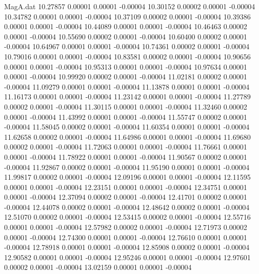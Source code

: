 \begin{filecontents}{MagA.dat}
  10.27857    0.00001    0.00001   -0.00004
  10.30152    0.00002    0.00001   -0.00004
  10.34782    0.00001    0.00001   -0.00004
  10.37109    0.00002    0.00001   -0.00004
  10.39386    0.00001    0.00001   -0.00004
  10.44089    0.00001    0.00001   -0.00004
  10.46463    0.00002    0.00001   -0.00004
  10.55690    0.00002    0.00001   -0.00004
  10.60400    0.00002    0.00001   -0.00004
  10.64967    0.00001    0.00001   -0.00004
  10.74361    0.00002    0.00001   -0.00004
  10.79016    0.00001    0.00001   -0.00004
  10.83581    0.00002    0.00001   -0.00004
  10.90656    0.00001    0.00001   -0.00004
  10.95313    0.00001    0.00001   -0.00004
  10.97634    0.00001    0.00001   -0.00004
  10.99920    0.00002    0.00001   -0.00004
  11.02181    0.00002    0.00001   -0.00004
  11.09279    0.00001    0.00001   -0.00004
  11.13878    0.00001    0.00001   -0.00004
  11.16173    0.00001    0.00001   -0.00004
  11.23142    0.00001    0.00001   -0.00004
  11.27789    0.00002    0.00001   -0.00004
  11.30115    0.00001    0.00001   -0.00004
  11.32460    0.00002    0.00001   -0.00004
  11.43992    0.00001    0.00001   -0.00004
  11.55747    0.00002    0.00001   -0.00004
  11.58045    0.00002    0.00001   -0.00004
  11.60354    0.00001    0.00001   -0.00004
  11.62658    0.00002    0.00001   -0.00004
  11.64986    0.00001    0.00001   -0.00004
  11.69680    0.00002    0.00001   -0.00004
  11.72063    0.00001    0.00001   -0.00004
  11.76661    0.00001    0.00001   -0.00004
  11.78922    0.00001    0.00001   -0.00004
  11.90567    0.00002    0.00001   -0.00004
  11.92867    0.00002    0.00001   -0.00004
  11.95190    0.00001    0.00001   -0.00004
  11.99817    0.00002    0.00001   -0.00004
  12.09196    0.00001    0.00001   -0.00004
  12.11595    0.00001    0.00001   -0.00004
  12.23151    0.00001    0.00001   -0.00004
  12.34751    0.00001    0.00001   -0.00004
  12.37094    0.00002    0.00001   -0.00004
  12.41701    0.00002    0.00001   -0.00004
  12.44078    0.00002    0.00001   -0.00004
  12.48642    0.00002    0.00001   -0.00004
  12.51070    0.00002    0.00001   -0.00004
  12.53415    0.00002    0.00001   -0.00004
  12.55716    0.00001    0.00001   -0.00004
  12.57982    0.00002    0.00001   -0.00004
  12.71973    0.00002    0.00001   -0.00004
  12.74300    0.00001    0.00001   -0.00004
  12.76610    0.00001    0.00001   -0.00004
  12.78918    0.00001    0.00001   -0.00004
  12.85908    0.00002    0.00001   -0.00004
  12.90582    0.00001    0.00001   -0.00004
  12.95246    0.00001    0.00001   -0.00004
  12.97601    0.00002    0.00001   -0.00004
  13.02159    0.00001    0.00001   -0.00004

\end{filecontents}
